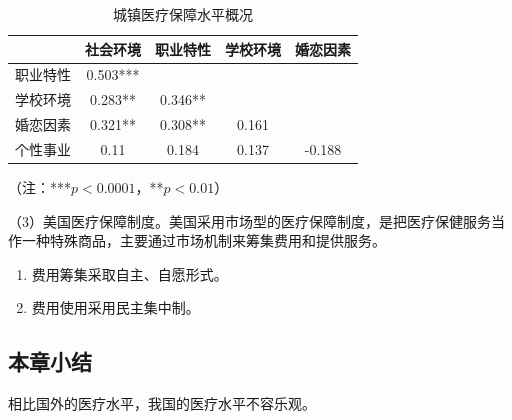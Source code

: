 \begin{table}[H]
  \centering
  \caption{城镇医疗保障水平概况}
  \begin{threeparttable}
    \begin{tabular}{p{4.19em}cccc}
    \hline
    \multicolumn{1}{r}{} & \multicolumn{1}{l}{社会环境} & \multicolumn{1}{l}{职业特性} & \multicolumn{1}{l}{学校环境} & \multicolumn{1}{l}{婚恋因素} \bigstrut\\
    \hline
    职业特性  & 0.503*** &       &       &  \\
    学校环境  & 0.283** & 0.346** &       &  \\
    婚恋因素  & 0.321** & 0.308** & 0.161 &  \\
    个性事业  & 0.11  & 0.184 & 0.137 & -0.188 \\
    \hline
    \end{tabular}%
    \begin{tablenotes}
      \item{（注：***$p<0.0001$，**$p<0.01$）}
    \end{tablenotes}
  \end{threeparttable}
  \label{tab:城镇医疗保障水平概况}%
\end{table}%

（3）美国医疗保障制度。美国采用市场型的医疗保障制度，是把医疗保健服务当作一种特殊商品，主要通过市场机制来筹集费用和提供服务。

\begin{enumerate}[label=\textcircled{\footnotesize\arabic*}]
  \item{费用筹集采取自主、自愿形式。}
  \item{费用使用采用民主集中制。}
\end{enumerate}


\subsection{本章小结}

相比国外的医疗水平，我国的医疗水平不容乐观。


